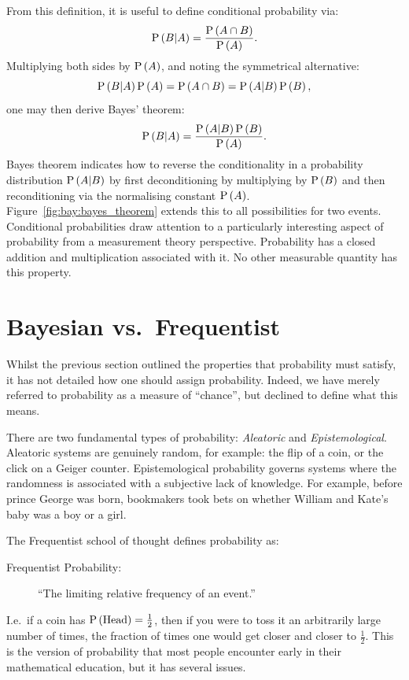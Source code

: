 From this definition, it is useful to define conditional probability via:
\begin{equation}
  \mathrm{P}\left(B\middle|A\right) = \frac{\mathrm{P}\left(A\cap B\right)}{\mathrm{P}\left(A\right)}.
  \label{eqn:bay:cond}
\end{equation}
Multiplying both sides by $\mathrm{P}\left(A\right)$, and noting the symmetrical alternative:
\begin{equation}
  \mathrm{P}\left(B\middle|A\right)\mathrm{P}\left(A\right) = \mathrm{P}\left(A\cap B\right) = \mathrm{P}\left(A\middle|B\right)\mathrm{P}\left(B\right),
  \label{eqn:bay:sym}
\end{equation}
one may then derive Bayes' theorem:
\begin{align}
  \mathrm{P}\left(B\middle|A\right) &= \frac{\mathrm{P}\left(A\middle|B\right)\mathrm{P}\left(B\right)}{\mathrm{P}\left(A\right)}.\\
  \label{eqn:bay:bayes}
\end{align}
Bayes theorem indicates how to reverse the conditionality in a probability distribution $\mathrm{P}\left(A\middle|B\right)$ by first deconditioning by multiplying by $\mathrm{P}\left(B\right)$ and then reconditioning via the normalising constant $\mathrm{P}\left(A\right)$. Figure~\ref{fig:bay:bayes_theorem} extends this to all possibilities for two events.
Conditional probabilities draw attention to a particularly interesting aspect of probability from a measurement theory perspective. Probability has a closed addition and multiplication associated with it. No other measurable quantity has this property.

\section{Bayesian vs.\ Frequentist}
\label{sec:bay:bayesian_frequentist}

Whilst the previous section outlined the properties that probability must satisfy, it has not detailed how one should assign probability. Indeed, we have merely referred to probability as a measure of ``chance'', but declined to define what this means.

There are two fundamental types of probability: {\em Aleatoric\/} and {\em Epistemological}. Aleatoric systems are genuinely random, for example: the flip of a coin, or the click on a Geiger counter. Epistemological probability governs systems where the randomness is associated with a subjective lack of knowledge. For example, before prince George was born, bookmakers took bets on whether William and Kate's baby was a boy or a girl. 

The Frequentist school of thought defines probability as:
\begin{description}
  \item[Frequentist Probability:]``The limiting relative frequency of an event.''
\end{description}
I.e.\ if a coin has $\mathrm{P}\left(\mathrm{Head}\right)=\frac{1}{2}$, then if you were to toss it an arbitrarily large number of times, the fraction of times one would get closer and closer to $\frac{1}{2}$. This is the version of probability that most people encounter early in their mathematical education, but it has several issues.

